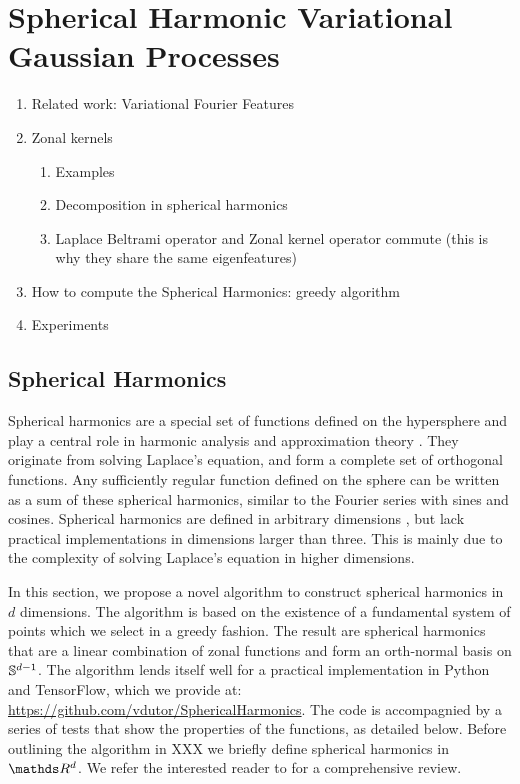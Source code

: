 \chapter{Spherical Harmonic Variational Gaussian Processes}

\begin{enumerate}
    \item Related work: Variational Fourier Features
    \item Zonal kernels
    \begin{enumerate}
        \item Examples
        \item Decomposition in spherical harmonics
        \item Laplace Beltrami operator and Zonal kernel operator commute (this is why they share the same eigenfeatures)
    \end{enumerate}
    \item How to compute the Spherical Harmonics: greedy algorithm
    \item Experiments
\end{enumerate}


\section{Spherical Harmonics}

Spherical harmonics are a special set of functions defined on the hypersphere and play a central role in harmonic analysis and approximation theory \citep{wendland2005}. They originate from solving Laplace's equation, and form a complete set of orthogonal functions. Any sufficiently regular function defined on the sphere can be written as a sum of these spherical harmonics, similar to the Fourier series with sines and cosines. Spherical harmonics are defined in arbitrary dimensions \citep{frye2014,dai2013}, but lack practical implementations in dimensions larger than three. This is mainly due to the complexity of solving Laplace's equation in higher dimensions.

In this section, we propose a novel algorithm to construct spherical harmonics in $d$ dimensions. The algorithm is based on the existence of a fundamental system of points which we select in a greedy fashion. The result are spherical harmonics that are a linear combination of zonal functions and form an orth-normal basis on $\mathbb{S}^{d-1}$. The algorithm lends itself well for a practical implementation in Python and TensorFlow, which we provide at: \url{https://github.com/vdutor/SphericalHarmonics}. The code is accompagnied by a series of tests that show the properties of the functions, as detailed below. Before outlining the algorithm in XXX we briefly define spherical harmonics in $\Reals^d$. We refer the interested reader to \citet{dai2013,frye2014} for a comprehensive review.

